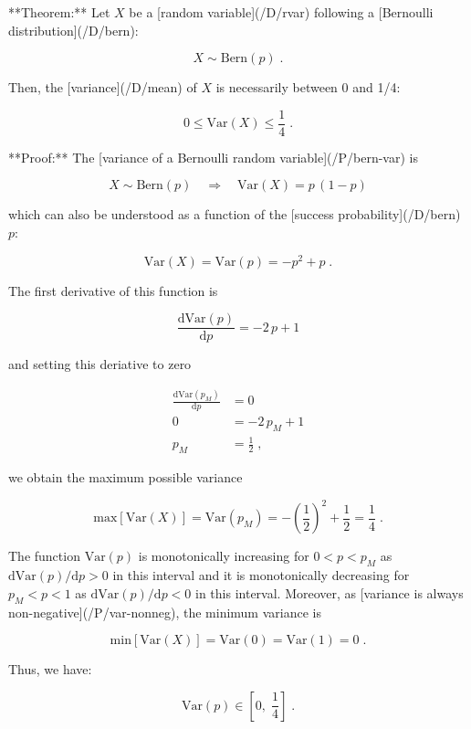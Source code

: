 \documentclass[a4paper,12pt]{article}
\begin{document}
**Theorem:** Let $X$ be a [random variable](/D/rvar) following a [Bernoulli distribution](/D/bern):

$$ \label{eq:bern}
X \sim \mathrm{Bern}(p) \; .
$$

Then, the [variance](/D/mean) of $X$ is necessarily between 0 and 1/4:

$$ \label{eq:bern-var-range}
0 \leq \mathrm{Var}(X) \leq \frac{1}{4} \; .
$$


**Proof:** The [variance of a Bernoulli random variable](/P/bern-var) is

$$ \label{eq:bern-var}
X \sim \mathrm{Bern}(p) \quad \Rightarrow \quad \mathrm{Var}(X) = p \, (1-p)
$$

which can also be understood as a function of the [success probability](/D/bern) $p$:

$$ \label{eq:bern-var-p}
\mathrm{Var}(X) = \mathrm{Var}(p) = -p^2 + p \; .
$$

The first derivative of this function is

$$ \label{eq:dVar-dp}
\frac{\mathrm{d}\mathrm{Var}(p)}{\mathrm{d}p} = -2 \, p + 1
$$

and setting this deriative to zero

\begin{equation} \label{eq:dVar-dp-0}
\begin{split}
\frac{\mathrm{d}\mathrm{Var}(p_M)}{\mathrm{d}p} &= 0 \\
0 &= -2 \, p_M + 1 \\
p_M &= \frac{1}{2} \; ,
\end{split}
\end{equation}

we obtain the maximum possible variance

$$ \label{eq:bern-var-max}
\mathrm{max}\left[\mathrm{Var}(X)\right] = \mathrm{Var}(p_M) = -\left( \frac{1}{2} \right)^2 + \frac{1}{2} = \frac{1}{4} \; .
$$

The function $\mathrm{Var}(p)$ is monotonically increasing for $0 < p < p_M$ as $\mathrm{d}\mathrm{Var}(p)/\mathrm{d}p > 0$ in this interval and it is monotonically decreasing for $p_M < p < 1$ as $\mathrm{d}\mathrm{Var}(p)/\mathrm{d}p < 0$ in this interval. Moreover, as [variance is always non-negative](/P/var-nonneg), the minimum variance is

$$ \label{eq:bern-var-min}
\mathrm{min}\left[\mathrm{Var}(X)\right] = \mathrm{Var}(0) = \mathrm{Var}(1) = 0 \; .
$$

Thus, we have:

$$ \label{eq:bern-var-int}
\mathrm{Var}(p) \in \left[ 0, \; \frac{1}{4} \right] \; .
$$
\end{document}
